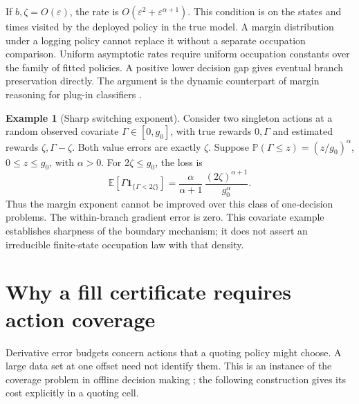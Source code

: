 \documentclass[11pt]{article}
\theoremstyle{plain}
\theoremstyle{definition}
\newtheorem{example}[theorem]{Example}
\theoremstyle{remark}
\newcommand{\E}{\mathbb E}
\begin{document}
If \(b,\zeta=O(\varepsilon)\), the rate is
\(O(\varepsilon^2+\varepsilon^{\alpha+1})\).
This condition is on the states and times visited by the deployed
policy in the true model. A margin distribution under a logging policy
cannot replace it without a separate occupation comparison.
Uniform asymptotic rates require uniform occupation constants over
the family of fitted policies. A positive lower decision gap gives
eventual branch preservation directly.
The argument is the dynamic counterpart of margin reasoning for
plug-in classifiers \citep{AudibertTsybakov2007}.

\begin{example}[Sharp switching exponent]\label{ex:marginsharp}
Consider two singleton actions at a random observed covariate
\(\Gamma\in[0,g_0]\), with true rewards \(0,\Gamma\) and estimated
rewards \(\zeta,\Gamma-\zeta\). Both value errors are exactly
\(\zeta\). Suppose
\(\mathbb P(\Gamma\le z)=(z/g_0)^\alpha\), \(0\le z\le g_0\),
with \(\alpha>0\). For \(2\zeta\le g_0\), the loss is
\[
\E[\Gamma\mathbf1_{\{\Gamma<2\zeta\}}]
=\frac{\alpha}{\alpha+1}\,
       \frac{(2\zeta)^{\alpha+1}}{g_0^\alpha}.
\]
Thus the margin exponent cannot be improved over this class of
one-decision problems. The within-branch gradient error is zero.
This covariate example establishes sharpness of the boundary
mechanism; it does not assert an irreducible finite-state occupation
law with that density.
\end{example}

\section{Why a fill certificate requires action coverage}

Derivative error budgets concern actions that a quoting policy might
choose. A large data set at one offset need not identify them. This
is an instance of the coverage problem in offline decision making
\citep{JinYangWang2021}; the following construction gives its cost
explicitly in a quoting cell.
\end{document}
